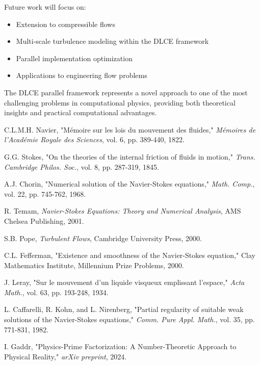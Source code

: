 \documentclass[conference]{IEEEtran}
\begin{document}
Future work will focus on:
\begin{itemize}
\item Extension to compressible flows
\item Multi-scale turbulence modeling within the DLCE framework  
\item Parallel implementation optimization
\item Applications to engineering flow problems
\end{itemize}

The DLCE parallel framework represents a novel approach to one of the most challenging problems in computational physics, providing both theoretical insights and practical computational advantages.

\begin{thebibliography}{9}

C.L.M.H. Navier, "M{\'e}moire sur les lois du mouvement des fluides," \textit{M{\'e}moires de l'Acad{\'e}mie Royale des Sciences}, vol. 6, pp. 389-440, 1822.

G.G. Stokes, "On the theories of the internal friction of fluids in motion," \textit{Trans. Cambridge Philos. Soc.}, vol. 8, pp. 287-319, 1845.

A.J. Chorin, "Numerical solution of the Navier-Stokes equations," \textit{Math. Comp.}, vol. 22, pp. 745-762, 1968.

R. Temam, \textit{Navier-Stokes Equations: Theory and Numerical Analysis}, AMS Chelsea Publishing, 2001.

S.B. Pope, \textit{Turbulent Flows}, Cambridge University Press, 2000.

C.L. Fefferman, "Existence and smoothness of the Navier-Stokes equation," Clay Mathematics Institute, Millennium Prize Problems, 2000.

J. Leray, "Sur le mouvement d'un liquide visqueux emplissant l'espace," \textit{Acta Math.}, vol. 63, pp. 193-248, 1934.

L. Caffarelli, R. Kohn, and L. Nirenberg, "Partial regularity of suitable weak solutions of the Navier-Stokes equations," \textit{Comm. Pure Appl. Math.}, vol. 35, pp. 771-831, 1982.

I. Gaddr, "Physics-Prime Factorization: A Number-Theoretic Approach to Physical Reality," \textit{arXiv preprint}, 2024.

\end{thebibliography}
\end{document}
